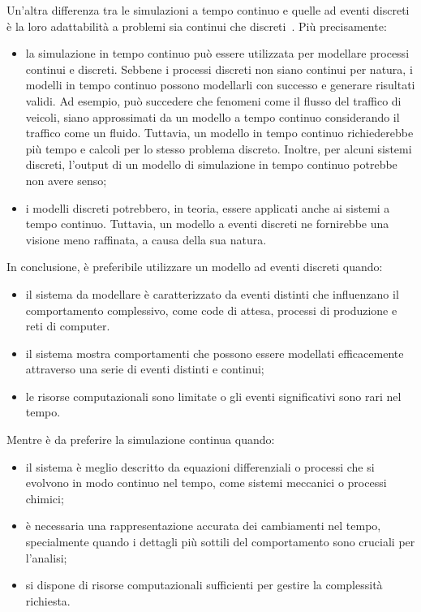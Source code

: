 \documentclass[12pt,a4paper,openright,twoside]{book}
\begin{document}
Un'altra differenza tra le simulazioni a tempo continuo e quelle ad eventi discreti è la loro adattabilità a problemi sia continui che discreti~\cite{zgn2009DiscreteVC}. Più precisamente:
\begin{itemize}
    \item la simulazione in tempo continuo può essere utilizzata per modellare processi continui e discreti. Sebbene i processi discreti non siano continui per natura, i modelli in tempo continuo possono modellarli con successo e generare risultati validi. Ad esempio, può succedere che fenomeni come il flusso del traffico di veicoli, siano approssimati da un modello a tempo continuo considerando il traffico come un fluido. Tuttavia, un modello in tempo continuo richiederebbe più tempo e calcoli per lo stesso problema discreto. Inoltre, per alcuni sistemi discreti, l'output di un modello di simulazione in tempo continuo potrebbe non avere senso;
    \item i modelli discreti potrebbero, in teoria, essere applicati anche ai sistemi a tempo continuo. Tuttavia, un modello a eventi discreti ne fornirebbe una visione meno raffinata, a causa della sua natura.
\end{itemize}

In conclusione, è preferibile utilizzare un modello ad eventi discreti quando: 
\begin{itemize}
    \item il sistema da modellare è caratterizzato da eventi distinti che influenzano il comportamento complessivo, come code di attesa, processi di produzione e reti di computer.
    \item il sistema mostra comportamenti che possono essere modellati efficacemente attraverso una serie di eventi distinti e continui; 
    \item le risorse computazionali sono limitate o gli eventi significativi sono rari nel tempo.
\end{itemize}
Mentre è da preferire la simulazione continua quando: 
\begin{itemize}
    \item il sistema è meglio descritto da equazioni differenziali o processi che si evolvono in modo continuo nel tempo, come sistemi meccanici o processi chimici; 
    \item è necessaria una rappresentazione accurata dei cambiamenti nel tempo, specialmente quando i dettagli più sottili del comportamento sono cruciali per l'analisi; 
    \item si dispone di risorse computazionali sufficienti per gestire la complessità richiesta.
\end{itemize}
\end{document}
